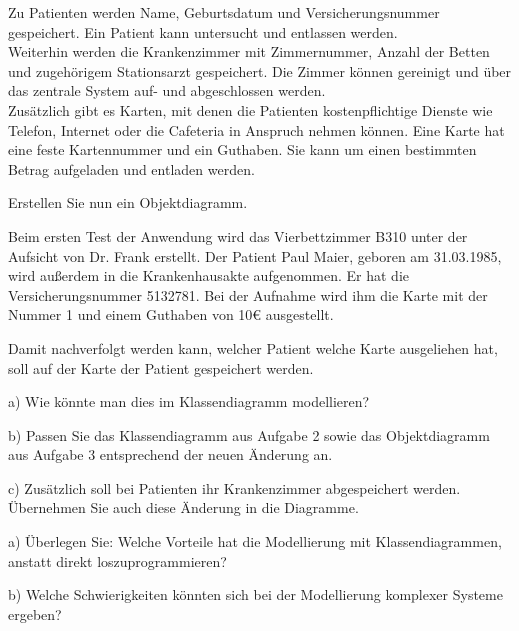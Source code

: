 \documentclass[11pt, a4paper, oneside]{article}
\begin{document}
	Zu Patienten werden Name, Geburtsdatum und Versicherungsnummer gespeichert.
	Ein Patient kann untersucht und entlassen werden.\\
	Weiterhin werden die Krankenzimmer mit Zimmernummer, Anzahl der Betten und zugehörigem Stationsarzt gespeichert.
	Die Zimmer können gereinigt und über das zentrale System auf- und abgeschlossen werden.\\
	Zusätzlich gibt es Karten, mit denen die Patienten kostenpflichtige Dienste wie Telefon, Internet oder die Cafeteria in Anspruch nehmen können.
	Eine Karte hat eine feste Kartennummer und ein Guthaben.
	Sie kann um einen bestimmten Betrag aufgeladen und entladen werden.
	
	
	Erstellen Sie nun ein Objektdiagramm.
	
	Beim ersten Test der Anwendung wird das Vierbettzimmer B310 unter der Aufsicht von Dr. Frank erstellt.
	Der Patient Paul Maier, geboren am 31.03.1985, wird außerdem in die Krankenhausakte aufgenommen.
	Er hat die Versicherungsnummer 5132781.
	Bei der Aufnahme wird ihm die Karte mit der Nummer 1 und einem Guthaben von 10€ ausgestellt.
	
	\pagebreak
	
	Damit nachverfolgt werden kann, welcher Patient welche Karte ausgeliehen hat, soll auf der Karte der Patient gespeichert werden.
	
	a) Wie könnte man dies im Klassendiagramm modellieren?
	
	\lines[3cm]
	
	b) Passen Sie das Klassendiagramm aus Aufgabe 2 sowie das Objektdiagramm aus Aufgabe 3 entsprechend der neuen Änderung an.
	
	c) Zusätzlich soll bei Patienten ihr Krankenzimmer abgespeichert werden.
	Übernehmen Sie auch diese Änderung in die Diagramme.
	
	
	a) Überlegen Sie: Welche Vorteile hat die Modellierung mit Klassendiagrammen, anstatt direkt loszuprogrammieren?
	
	\lines[3cm]
	
	b) Welche Schwierigkeiten könnten sich bei der Modellierung komplexer Systeme ergeben?
	
	\lines[3cm]
	
\end{document}
